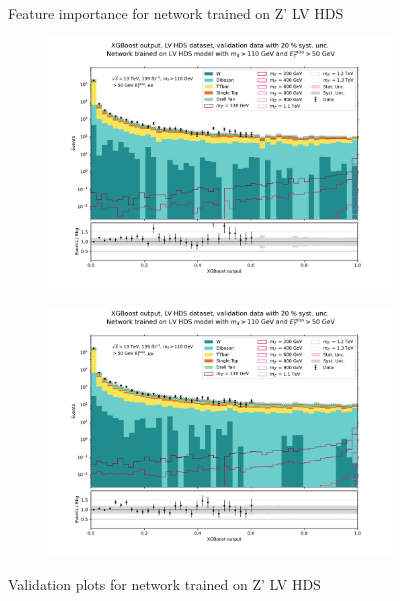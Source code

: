 \documentclass[12pt, a4paper]{book}
\begin{document}
\begin{figure}[!ht]
\begin{subfigure}[b]{0.7\textwidth}
      \end{subfigure}
   \caption{Feature importance for network trained on Z' LV HDS}\label{fig:LV_HDS_feat}
\end{figure}
\begin{figure}[!ht]
	\centering
	\begin{subfigure}[b]{0.49\textwidth}
      \centering
      \includegraphics[width=1\textwidth]{XGBoost/LV_HDS/VAL_ee.pdf}
      \end{subfigure}
   \hfill
   \begin{subfigure}[b]{0.49\textwidth}
      \centering
      \includegraphics[width=1\textwidth]{XGBoost/LV_HDS/VAL_uu.pdf}
      \end{subfigure}
   \caption{Validation plots for network trained on Z' LV HDS}\label{fig:LV_HDS_vals}
\end{figure}
\end{document}
